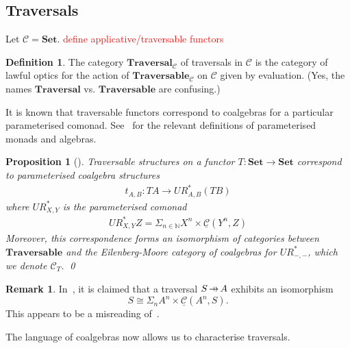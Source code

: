 \documentclass[11pt,a4paper]{article}
\theoremstyle{plain}
\newtheorem{proposition}[theorem]{Proposition}
\theoremstyle{definition}
\newtheorem{definition}[theorem]{Definition}
\newtheorem{remark}[theorem]{Remark}
\newcommand{\C}{\mathscr{C}}
\newcommand{\homC}{\underline{\C}}
\newcommand{\bN}{\mathbb{N}}
\newcommand{\Set}{\mathbf{Set}}
\newcommand{\Traversable}{\mathbf{Traversable}}
\newcommand{\Traversal}{\mathbf{Traversal}}
\newcommand{\hto}{\ensuremath{\,\mathaccent\shortmid\rightarrow\,}}
\newcommand{\todo}[1]{\textcolor{red}{\small #1}}
\begin{document}
\subsection{Traversals}
Let $\C = \Set$. \todo{define applicative/traversable functors}

\begin{definition}
The category $\Traversal_\C$ of traversals in $\C$ is the category of lawful optics for the action of $\Traversable_\C$ on $\C$ given by evaluation. (Yes, the names $\Traversal$ vs\@. $\Traversable$ are confusing.)
\end{definition}

It is known that traversable functors correspond to coalgebras for a particular parameterised comonad. See~\cite{AlgebrasForParameterisedMonads} for the relevant definitions of parameterised monads and algebras.

\begin{proposition}[{\cite[Theorem 4.10, Proposition 5.4]{SecondOrderFunctionals}}]
Traversable structures on a functor $T : \Set \to \Set$ correspond to parameterised coalgebra structures
\begin{align*}
t_{A, B} : TA \to UR^*_{A, B}(T B)
\end{align*} 
where $UR^*_{X,Y}$ is the parameterised comonad
\begin{align*}
UR^*_{X, Y} Z = \Sigma_{n\in \bN} X^n \times \homC(Y^n,Z)
\end{align*}
Moreover, this correspondence forms an isomorphism of categories between $\Traversable$ and the Eilenberg-Moore category of coalgebras for $UR^*_{-, -}$, which we denote $\C_T$. \qed
\end{proposition}


\begin{remark}
In~\cite[Section 2.3]{ProfunctorOptics}, it is claimed that a traversal $S \hto A$ exhibits an isomorphism \[S \cong \Sigma_n A^n \times \homC(A^n,S).\] This appears to be a misreading of~\cite[Proposition 5.4]{SecondOrderFunctionals}.
\end{remark}

The language of coalgebras now allows us to characterise traversals.
\end{document}
